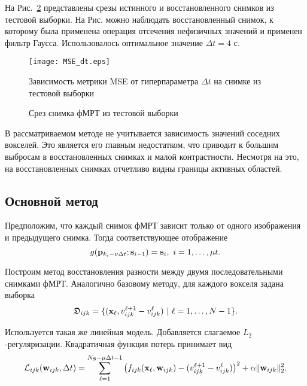 \documentclass[a4paper, 12pt]{article}
\begin{document}
	На Рис.~\ref*{fig:1} представлены срезы истинного и восстановленного снимков из 
	тестовой выборки. На Рис. можно наблюдать восстановленный снимок, к 
	которому была применена операция отсечения нефизичных значений и применен фильтр Гаусса.
	Использовалось оптимальное значение $\Delta t = 4 \text{ с}$.

	\begin{figure}[h!]
		\centering
		\texttt{[image: MSE\_dt.eps]}
		\caption{Зависимость метрики MSE от гиперпараметра $\Delta t$ на снимке из тестовой выборки}
		\label{fig:2}
	\end{figure}

	\begin{figure}[h!]
		\centering
		\hfill
		\hfill
		\caption{Срез снимка фМРТ из тестовой выборки}
		\label{fig:1}
	\end{figure}
	
	В рассматриваемом методе не учитывается зависимость значений соседних вокселей.
	Это является его главным недостатком, что приводит к большим выбросам в восстановленных снимках
	и малой контрастности. Несмотря на это, на восстановленных снимках отчетливо видны границы
	активных областей.

\subsection{Основной метод}

	Предположим, что каждый снимок фМРТ зависит только от одного изображения и предыдущего снимка.
	Тогда соответствующее отображение
	\begin{equation}
		\label{eq15}
		g(\mathbf{p}_{k_i - \nu \Delta t}; \mathbf{s}_{i-1}) = \mathbf{s}_i, \ i = 1, \ldots, \mu t.
	\end{equation}

	Построим метод восстановления разности между двумя последовательными 
	снимками фМРТ. Аналогично базовому методу, для каждого вокселя задана выборка
	\[ \mathfrak{D}_{ijk} = \{(\mathbf{x}_{\ell}, v^{\ell + 1}_{ijk} - v^{\ell}_{ijk}) \ | \ {\ell} = 1, \ldots, N-1 \}. \]

	Используется такая же линейная модель. Добавляется слагаемое $L_2$-регуляризации. 
	Квадратичная функция потерь принимает вид
	\begin{equation}
		\label{eq16}
		\mathcal{L}_{ijk}(\mathbf{w}_{ijk}, \Delta t) = \sum\limits_{\ell = 1}^{N_{\mathbf{S}} - \mu \Delta t - 1} \big(f_{ijk}(\mathbf{x}_{\ell}, \mathbf{w}_{ijk}) - (v^{\ell + 1}_{ijk} - v^{\ell}_{ijk})\big)^2 + \alpha \| \mathbf{w}_{ijk} \|_2^2.
	\end{equation}
\end{document}
